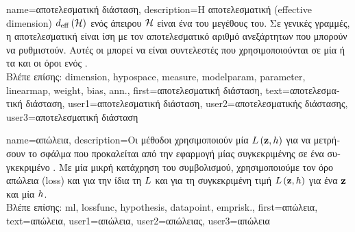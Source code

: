 {name={\foreignlanguage{greek}{αποτελεσματική διάσταση}},
	description={\foreignlanguage{greek}{Η αποτελεσματική}  
		(effective dimension) $d_{\rm eff} \left( \mathcal{H} \right)$ \foreignlanguage{greek}{ενός ά\-πειρου}  $\mathcal{H}$ 
		\foreignlanguage{greek}{είναι ένα}  \foreignlanguage{greek}{του μεγέθους του. 
		Σε γενικές γραμμές, η αποτελεσματική}  \foreignlanguage{greek}{είναι ίση με τον αποτελεσματικό αριθμό 
		ανεξάρτητων}  \foreignlanguage{greek}{που μπορούν να ρυθμιστούν. Αυτές οι}
		 \foreignlanguage{greek}{μπορεί να είναι συντελεστές που χρησιμοποιούνται σε μία}  
		\foreignlanguage{greek}{ή τα}  \foreignlanguage{greek}{και οι όροι}  \foreignlanguage{greek}{ενός} 
		.
		\\
		\foreignlanguage{greek}{Βλέπε επίσης:} \gls{dimension}, \gls{hypospace}, \gls{measure}, \gls{modelparam}, \gls{parameter}, \gls{linearmap}, 
		\gls{weight}, \gls{bias}, \gls{ann}.},
	first={\foreignlanguage{greek}{αποτελεσματική διάσταση}},
	text={\foreignlanguage{greek}{αποτελεσματική διάσταση}},
	user1={\foreignlanguage{greek}{αποτελεσματική διάσταση}}, %
	user2={\foreignlanguage{greek}{αποτελεσματικής διάστασης}}, %
	user3={\foreignlanguage{greek}{αποτελεσματική διάσταση}} %
}

{name={\foreignlanguage{greek}{απώλεια}}, 
	description={\foreignlanguage{greek}{Οι μέθοδοι}  
		\foreignlanguage{greek}{χρησιμοποιούν μία}  $L\left({\bf z},h \right)$ \foreignlanguage{greek}{για 
		να μετρήσουν το σφάλμα που προκαλείται από την εφαρμογή μίας συγκεκριμένης}  
		\foreignlanguage{greek}{σε ένα συγκεκριμένο} . \foreignlanguage{greek}{Με μία μικρή κατάχρηση του 
		συμβολισμού, χρησιμοποιούμε τον όρο απώλεια} (loss) \foreignlanguage{greek}{και για την ίδια τη}  $L$ 
		\foreignlanguage{greek}{και για τη συγκεκριμένη τιμή} $L\left({\bf z},h \right)$ \foreignlanguage{greek}{για ένα} 
		 ${\bf z}$ \foreignlanguage{greek}{και μία}  $h$.
		\\
		\foreignlanguage{greek}{Βλέπε επίσης:} \gls{ml}, \gls{lossfunc}, \gls{hypothesis}, \gls{datapoint}, \gls{emprisk}.},
	first={\foreignlanguage{greek}{απώλεια}},
	text={\foreignlanguage{greek}{απώλεια}},
	user1={\foreignlanguage{greek}{απώλεια}}, %
	user2={\foreignlanguage{greek}{απώλειας}}, %
	user3={\foreignlanguage{greek}{απώλεια}} %
}

